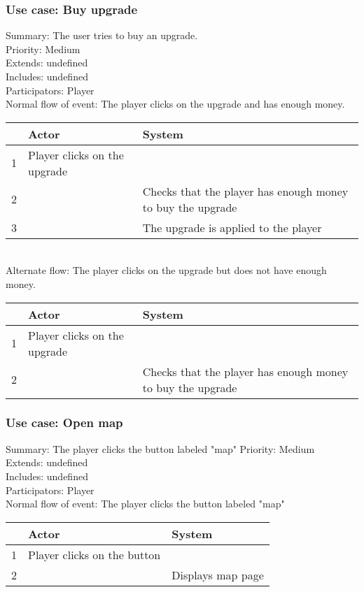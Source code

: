 \documentclass{article}
\begin{document}
\subsubsection{Use case: Buy upgrade}
Summary: The user tries to buy an upgrade.\\
Priority: Medium\\
Extends: undefined\\
Includes: undefined\\
Participators: Player\\
Normal flow of event: The player clicks on the upgrade and has enough money.\\
\begin{tabular}{|c|l|l|} \hline
      & Actor & System \\ \hline
    1 & Player clicks on the upgrade & \\ \hline
    2 & & Checks that the player has enough money to buy the upgrade \\ \hline
    3 & & The upgrade is applied to the player \\ \hline
\end{tabular}\\ 
Alternate flow: The player clicks on the upgrade but does not have enough money. \\
\begin{tabular}{|c|l|l|} \hline
      & Actor & System \\ \hline
    1 & Player clicks on the upgrade & \\ \hline
    2 & & Checks that the player has enough money to buy the upgrade \\ \hline
\end{tabular} 

\subsubsection{Use case: Open map}
Summary: The player clicks the button labeled "map"
Priority: Medium \\
Extends: undefined\\
Includes: undefined\\
Participators: Player \\
Normal flow of event: The player clicks the button labeled "map"\\
\begin{tabular}{|c|l|l|} \hline
      & Actor & System \\ \hline
    1 & Player clicks on the button & \\ \hline
    2 & & Displays map page \\ \hline
\end{tabular} 
\end{document}
